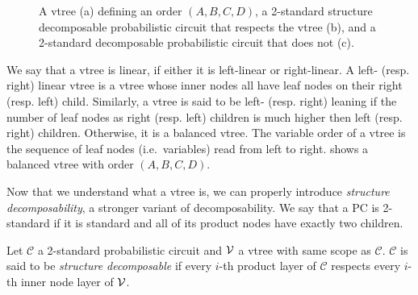 \begin{figure}[t]
\begin{subfigure}[t]{0.35\textwidth}
{
    }
    \caption{}
    \label{fig:norespect}
  \end{subfigure}
  \caption{A vtree (a) defining an order $(A,B,C,D)$, a 2-standard structure decomposable
    probabilistic circuit that respects the vtree (b), and a 2-standard decomposable probabilistic
    circuit that does not (c).}
  \label{fig:vtreeresp}
\end{figure}

We say that a vtree is linear, if either it is left-linear or right-linear. A left- (resp. right)
linear vtree is a vtree whose inner nodes all have leaf nodes on their right (resp. left) child.
Similarly, a vtree is said to be left- (resp. right) leaning if the number of leaf nodes as right
(resp. left) children is much higher then left (resp. right) children. Otherwise, it is a balanced
vtree. The variable order of a vtree is the sequence of leaf nodes (i.e.\ variables) read from left
to right.  shows a balanced vtree with order $(A,B,C,D)$.

Now that we understand what a vtree is, we can properly introduce \emph{structure decomposability},
a stronger variant of decomposability. We say that a PC is 2-standard if it is standard and all of
its product nodes have exactly two children.

\begin{definition}
  \label{def:sdec}%
  Let $\mathcal{C}$ a 2-standard probabilistic circuit and $\operatorname{\mathcal{V}}$ a vtree with same scope as
  $\mathcal{C}$. $\mathcal{C}$ is said to be \emph{structure decomposable} if every $i$-th product
  layer of $\mathcal{C}$ respects every $i$-th inner node layer of $\operatorname{\mathcal{V}}$.
\end{definition}


